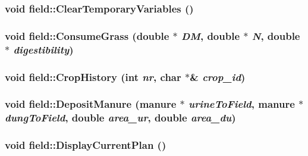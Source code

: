 \label{classfield_abc9f4e1d63c6f056029895d84884e07c}
\hypertarget{classfield_ae1b97f96f274b114d6d92c1ce80f3dfd}{
\subsubsection[{ClearTemporaryVariables}]{\setlength{\rightskip}{0pt plus 5cm}void field::ClearTemporaryVariables ()}}
\label{classfield_ae1b97f96f274b114d6d92c1ce80f3dfd}
\hypertarget{classfield_aec7bb755e251aa39a8469e57131dd183}{
\subsubsection[{ConsumeGrass}]{\setlength{\rightskip}{0pt plus 5cm}void field::ConsumeGrass (double $\ast$ {\em DM}, \/  double $\ast$ {\em N}, \/  double $\ast$ {\em digestibility})}}
\label{classfield_aec7bb755e251aa39a8469e57131dd183}
\hypertarget{classfield_a468fc8855c94286509a39dfcd8130c2b}{
\subsubsection[{CropHistory}]{\setlength{\rightskip}{0pt plus 5cm}void field::CropHistory (int {\em nr}, \/  char $\ast$\& {\em crop\_\-id})}}
\label{classfield_a468fc8855c94286509a39dfcd8130c2b}
\hypertarget{classfield_a5b62b48e403a06c3728b246265b7fb57}{
\subsubsection[{DepositManure}]{\setlength{\rightskip}{0pt plus 5cm}void field::DepositManure ({\bf manure} $\ast$ {\em urineToField}, \/  {\bf manure} $\ast$ {\em dungToField}, \/  double {\em area\_\-ur}, \/  double {\em area\_\-du})}}
\label{classfield_a5b62b48e403a06c3728b246265b7fb57}
\hypertarget{classfield_a5c05b940e58b24dae910654ee8a4eca0}{
\subsubsection[{DisplayCurrentPlan}]{\setlength{\rightskip}{0pt plus 5cm}void field::DisplayCurrentPlan ()}}
